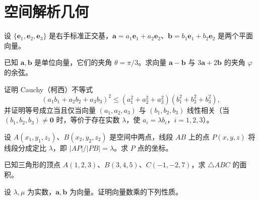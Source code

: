 \renewcommand{\thesection}{\arabic{section}}\renewcommand{\theHsection}{chapter.\arabic{section}}\setcounter{section}{7}\section{空间解析几何}
\noindent\begin{minipage}{\textwidth}
设 $\{\mathbf e_1,\mathbf e_2,\mathbf e_3\}$ 是右手标准正交基，$\mathbf a=a_1\mathbf e_1+a_2\mathbf e_2$、$\mathbf b=b_1\mathbf e_1+b_2\mathbf e_2$ 是两个平面向量。
\end{minipage}\par\vfill
\noindent\begin{minipage}{\textwidth}
已知 $\mathbf a,\mathbf b$ 是单位向量，它们的夹角 $\theta=\pi/3$。求向量 $\mathbf a-\mathbf b$ 与 $3\mathbf a+2\mathbf b$ 的夹角 $\varphi$ 的余弦。
\end{minipage}\par\vfill
\noindent\begin{minipage}{\textwidth}
证明 Cauchy（柯西）不等式\[(a_1b_1+a_2b_2+a_3b_3)^2\le(a_1^2+a_2^2+a_3^2)(b_1^2+b_2^2+b_3^2),\]并证明等号成立当且仅当向量 $(a_1,a_2,a_3)$ 与 $(b_1,b_2,b_3)$ 线性相关（当 $(b_1,b_2,b_3)\ne\mathbf0$ 时，等价于存在实数 $\lambda$，使 $a_i=\lambda b_i$，$i=1,2,3$）。
\end{minipage}\par\vfill
\noindent\begin{minipage}{\textwidth}
设 $A(x_1,y_1,z_1)$、$B(x_2,y_2,z_2)$ 是空间中两点，线段 $AB$ 上的点 $P(x,y,z)$ 将线段分成定比 $\lambda$，即 $|AP|/|PB|=\lambda$。求 $P$ 点的坐标。
\end{minipage}\par\vfill
\newpage
\noindent\begin{minipage}{\textwidth}
已知三角形的顶点 $A(1,2,3)$、$B(3,4,5)$、$C(-1,-2,7)$，求 $\triangle ABC$ 的面积。
\end{minipage}\par\vfill
\noindent\begin{minipage}{\textwidth}
设 $\lambda,\mu$ 为实数，$\mathbf a,\mathbf b$ 为向量。证明向量数乘的下列性质。
\end{minipage}\par\vfill
